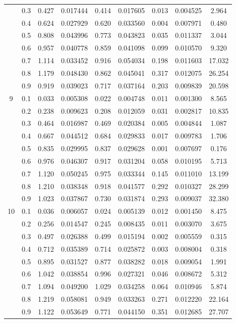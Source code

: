 \begin{longtable}{ | c | c || c | c | c | c | c | c | c | }
 & 0.3 & 0.427 & 0.017444 & 0.414 & 0.017605 & 0.013 & 0.004525 & 2.964 \\
 & 0.4 & 0.624 & 0.027929 & 0.620 & 0.033560 & 0.004 & 0.007971 & 0.480 \\
 & 0.5 & 0.808 & 0.043996 & 0.773 & 0.043823 & 0.035 & 0.011337 & 3.044 \\
 & 0.6 & 0.957 & 0.040778 & 0.859 & 0.041098 & 0.099 & 0.010570 & 9.320 \\
 & 0.7 & 1.114 & 0.033452 & 0.916 & 0.054034 & 0.198 & 0.011603 & 17.032 \\
 & 0.8 & 1.179 & 0.048430 & 0.862 & 0.045041 & 0.317 & 0.012075 & 26.254 \\
 & 0.9 & 0.919 & 0.039023 & 0.717 & 0.037164 & 0.203 & 0.009839 & 20.598 \\
 \hline
\multirow{9}{*}{9} & 0.1 & 0.033 & 0.005308 & 0.022 & 0.004748 & 0.011 & 0.001300 & 8.565 \\
 & 0.2 & 0.238 & 0.009623 & 0.208 & 0.012059 & 0.031 & 0.002817 & 10.835 \\
 & 0.3 & 0.464 & 0.016987 & 0.469 & 0.020384 & 0.005 & 0.004844 & 1.087 \\
 & 0.4 & 0.667 & 0.044512 & 0.684 & 0.029833 & 0.017 & 0.009783 & 1.706 \\
 & 0.5 & 0.835 & 0.029995 & 0.837 & 0.029628 & 0.001 & 0.007697 & 0.176 \\
 & 0.6 & 0.976 & 0.046307 & 0.917 & 0.031204 & 0.058 & 0.010195 & 5.713 \\
 & 0.7 & 1.120 & 0.050245 & 0.975 & 0.033344 & 0.145 & 0.011010 & 13.199 \\
 & 0.8 & 1.210 & 0.038348 & 0.918 & 0.041577 & 0.292 & 0.010327 & 28.299 \\
 & 0.9 & 1.023 & 0.037867 & 0.730 & 0.031874 & 0.293 & 0.009037 & 32.380 \\
 \hline
\multirow{9}{*}{10} & 0.1 & 0.036 & 0.006057 & 0.024 & 0.005139 & 0.012 & 0.001450 & 8.475 \\
 & 0.2 & 0.256 & 0.014547 & 0.245 & 0.008435 & 0.011 & 0.003070 & 3.675 \\
 & 0.3 & 0.497 & 0.026388 & 0.499 & 0.015194 & 0.002 & 0.005559 & 0.315 \\
 & 0.4 & 0.712 & 0.035389 & 0.714 & 0.025872 & 0.003 & 0.008004 & 0.318 \\
 & 0.5 & 0.895 & 0.031527 & 0.877 & 0.038282 & 0.018 & 0.009054 & 1.991 \\
 & 0.6 & 1.042 & 0.038854 & 0.996 & 0.027321 & 0.046 & 0.008672 & 5.312 \\
 & 0.7 & 1.094 & 0.049200 & 1.029 & 0.034258 & 0.064 & 0.010946 & 5.874 \\
 & 0.8 & 1.219 & 0.058081 & 0.949 & 0.033263 & 0.271 & 0.012220 & 22.164 \\
 & 0.9 & 1.122 & 0.053649 & 0.771 & 0.044150 & 0.351 & 0.012685 & 27.707 \\
 \hline
\hline
\end{longtable}
 
